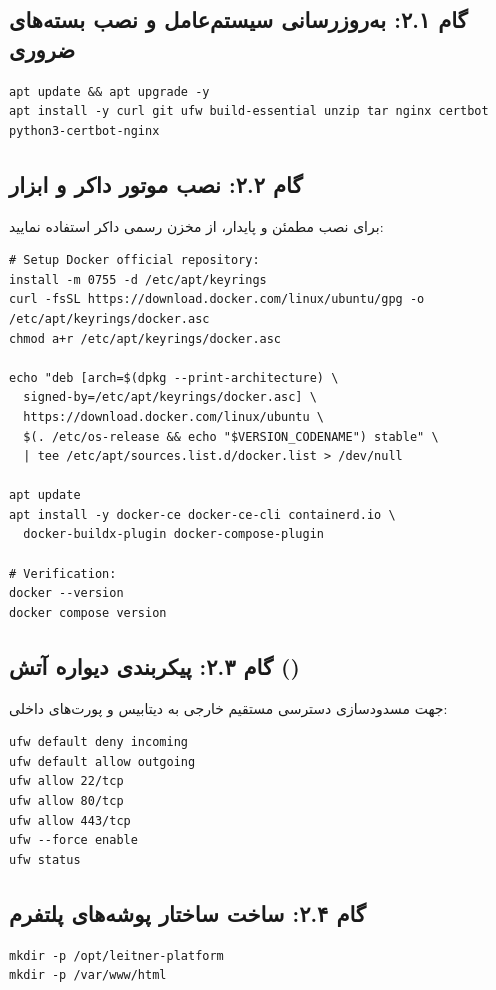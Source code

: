 \documentclass[11pt,a4paper]{article}
\begin{document}
\subsection{گام ۲.۱: به‌روزرسانی سیستم‌عامل و نصب بسته‌های ضروری}
\begin{latin}
\small
\begin{verbatim}
apt update && apt upgrade -y
apt install -y curl git ufw build-essential unzip tar nginx certbot python3-certbot-nginx
\end{verbatim}
\end{latin}

\subsection{گام ۲.۲: نصب موتور داکر و ابزار }
برای نصب مطمئن و پایدار، از مخزن رسمی داکر استفاده نمایید:
\begin{latin}
\small
\begin{verbatim}
# Setup Docker official repository:
install -m 0755 -d /etc/apt/keyrings
curl -fsSL https://download.docker.com/linux/ubuntu/gpg -o /etc/apt/keyrings/docker.asc
chmod a+r /etc/apt/keyrings/docker.asc

echo "deb [arch=$(dpkg --print-architecture) \
  signed-by=/etc/apt/keyrings/docker.asc] \
  https://download.docker.com/linux/ubuntu \
  $(. /etc/os-release && echo "$VERSION_CODENAME") stable" \
  | tee /etc/apt/sources.list.d/docker.list > /dev/null

apt update
apt install -y docker-ce docker-ce-cli containerd.io \
  docker-buildx-plugin docker-compose-plugin

# Verification:
docker --version
docker compose version
\end{verbatim}
\end{latin}

\subsection{گام ۲.۳: پیکربندی دیواره آتش ()}
جهت مسدودسازی دسترسی مستقیم خارجی به دیتابیس و پورت‌های داخلی:
\begin{latin}
\small
\begin{verbatim}
ufw default deny incoming
ufw default allow outgoing
ufw allow 22/tcp
ufw allow 80/tcp
ufw allow 443/tcp
ufw --force enable
ufw status
\end{verbatim}
\end{latin}

\subsection{گام ۲.۴: ساخت ساختار پوشه‌های پلتفرم}
\begin{latin}
\small
\begin{verbatim}
mkdir -p /opt/leitner-platform
mkdir -p /var/www/html
\end{verbatim}
\end{latin}
\end{document}
